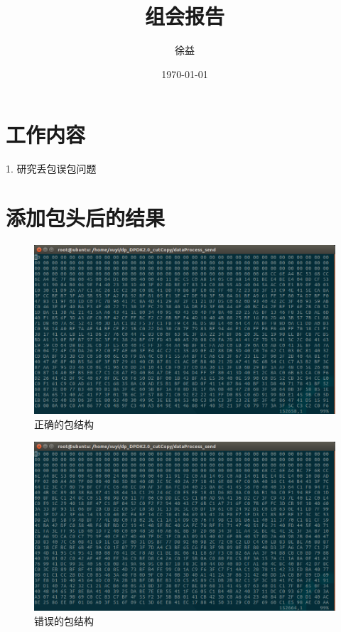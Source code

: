 \documentclass{article}
\title{组会报告}
\author{徐益}
\date{\today}
\begin{document}
\maketitle


\section{工作内容}

1. 研究丢包误包问题

\section{添加包头后的结果}

\begin{figure}[H]
	\centering
	\includegraphics[width = \textwidth]{package-right.png}
	\caption{正确的包结构}
\end{figure}
\begin{figure}[H]
	\centering
	\includegraphics[width = \textwidth]{package-wrong.png}
	\caption{错误的包结构}
\end{figure}
\end{document}
